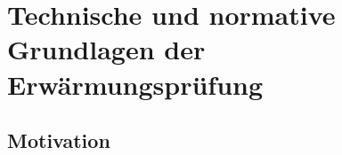 \section{Technische und normative Grundlagen der Erwärmungsprüfung}
\label{chap:theorieteil}

\subsection{Motivation}
\label{sec:motivation}